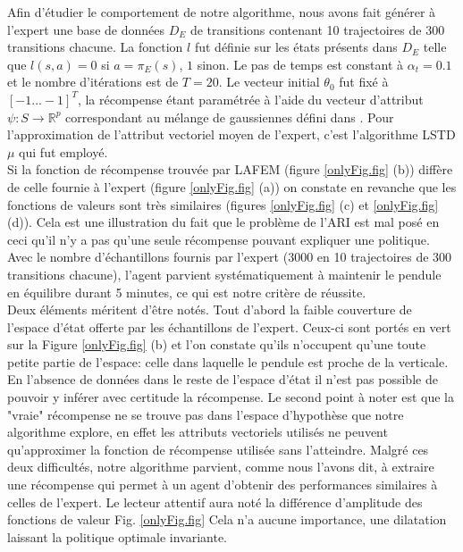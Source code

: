 \documentclass{article}
\begin{document}
Afin d'étudier le comportement de notre algorithme, nous avons fait générer à l'expert une base de données $D_E$ de transitions contenant 10 trajectoires de 300 transitions chacune. La fonction $l$ fut définie sur les états présents dans $D_E$ telle que $l(s,a) = 0$ si $a=\pi_E(s)$, $1$ sinon. Le pas de temps est constant à $\alpha_t = 0.1$ et le nombre d'itérations est de $T=20$. Le vecteur initial $\theta_0$ fut fixé à $[-1...-1]^T$, la récompense étant paramétrée à l'aide du vecteur d'attribut $\psi: S \rightarrow \mathbb{R}^p$ correspondant au mélange de gaussiennes défini dans \cite{lagoudakis2003least}. Pour l'approximation de l'attribut vectoriel moyen de l'expert, c'est l'algorithme LSTD$\mu$ qui fut employé.\\


Si la fonction de récompense trouvée par LAFEM (figure \ref{onlyFig.fig} (b)) diffère de celle fournie à l'expert (figure \ref{onlyFig.fig} (a)) on constate en revanche que les fonctions de valeurs sont très similaires (figures \ref{onlyFig.fig} (c) et \ref{onlyFig.fig} (d)). Cela est une illustration du fait que le problème de l'ARI est mal posé en ceci qu'il n'y a pas qu'une seule récompense pouvant expliquer une politique.\\

Avec le nombre d'échantillons fournis par l'expert (3000 en 10 trajectoires de 300 transitions chacune), l'agent parvient systématiquement à maintenir le pendule en équilibre durant 5 minutes, ce qui est notre critère de réussite.\\

Deux éléments méritent d'être notés. Tout d'abord la faible couverture de l'espace d'état offerte par les échantillons de l'expert. Ceux-ci sont portés en vert sur la Figure \ref{onlyFig.fig} (b) et l'on constate qu'ils n'occupent qu'une toute petite partie de l'espace: celle dans laquelle le pendule est proche de la verticale. En l'absence de données dans le reste de l'espace d'état il n'est pas possible de pouvoir y inférer avec certitude la récompense. Le second point à noter est que la "vraie" récompense ne se trouve pas dans l'espace d'hypothèse que notre algorithme explore, en effet les attributs vectoriels utilisés ne peuvent qu'approximer la fonction de récompense utilisée sans l'atteindre. Malgré ces deux difficultés, notre algorithme parvient, comme nous l'avons dit, à extraire une récompense qui permet à un agent d'obtenir des performances similaires à celles de l'expert. Le lecteur attentif aura noté la différence d'amplitude des fonctions de valeur Fig. \ref{onlyFig.fig} Cela n'a aucune importance, une dilatation laissant la politique optimale invariante.
\end{document}
